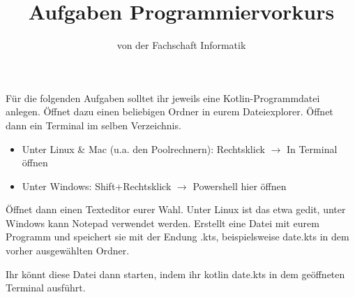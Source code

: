 
\title{Aufgaben Programmiervorkurs}
\subtitle{von der Fachschaft Informatik\hfill\ptitle}

\usepackage{enumitem}


\maketitle{}

Für die folgenden Aufgaben solltet ihr jeweils eine Kotlin-Programmdatei
anlegen. Öffnet dazu einen beliebigen Ordner in eurem Dateiexplorer. Öffnet
dann ein Terminal im selben Verzeichnis.

\begin{itemize}
    \item Unter Linux \& Mac (u.a. den Poolrechnern): Rechtsklick $\to$ In Terminal öffnen
    \item Unter Windows: Shift+Rechtsklick $\to$ Powershell hier öffnen
\end{itemize}

Öffnet dann einen Texteditor eurer Wahl. Unter Linux ist das etwa {\ttfamily gedit}, unter
Windows kann Notepad verwendet werden. Erstellt eine Datei mit eurem Programm
und speichert sie mit der Endung {\ttfamily.kts}, beispielsweise {\ttfamily date.kts}
in dem vorher ausgewählten Ordner.

Ihr könnt diese Datei dann starten, indem ihr {\ttfamily kotlin date.kts} in dem geöffneten Terminal ausführt.

